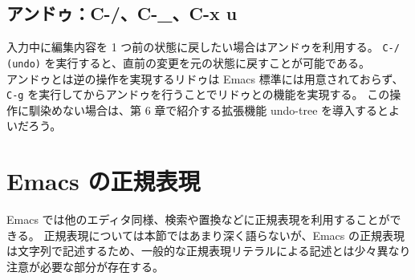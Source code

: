 \subsection{アンドゥ：C-/、C-\_、C-x u}
入力中に編集内容を 1 つ前の状態に戻したい場合はアンドゥを利用する。
\texttt{C-/ (undo)} を実行すると、直前の変更を元の状態に戻すことが可能である。\\

アンドゥとは逆の操作を実現するリドゥは Emacs 標準には用意されておらず、\texttt{C-g} を実行してからアンドゥを行うことでリドゥとの機能を実現する。
この操作に馴染めない場合は、第 6 章で紹介する拡張機能 undo-tree を導入するとよいだろう。\enlargethispage{1.00zw}
\section{Emacs の正規表現}
Emacs では他のエディタ同様、検索や置換などに正規表現を利用することができる。
正規表現については本節ではあまり深く語らないが、Emacs の正規表現は文字列で記述するため、一般的な正規表現リテラルによる記述とは少々異なり注意が必要な部分が存在する。
